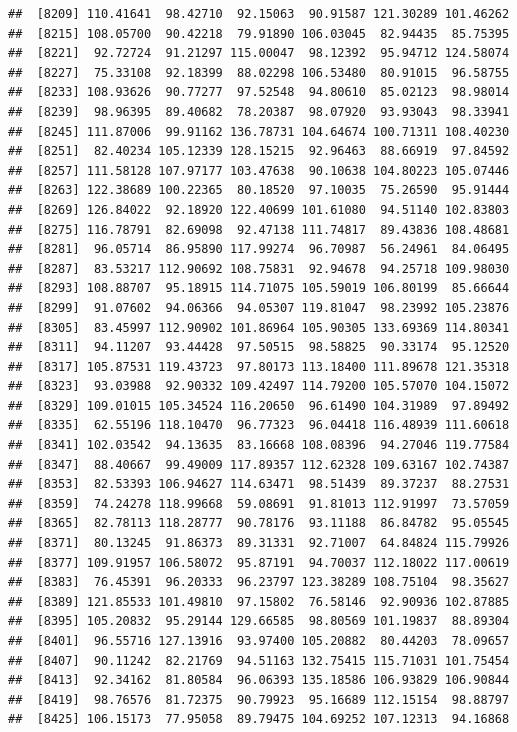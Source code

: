\documentclass[
]{article}
\begin{document}
\begin{verbatim}
##  [8209] 110.41641  98.42710  92.15063  90.91587 121.30289 101.46262
##  [8215] 108.05700  90.42218  79.91890 106.03045  82.94435  85.75395
##  [8221]  92.72724  91.21297 115.00047  98.12392  95.94712 124.58074
##  [8227]  75.33108  92.18399  88.02298 106.53480  80.91015  96.58755
##  [8233] 108.93626  90.77277  97.52548  94.80610  85.02123  98.98014
##  [8239]  98.96395  89.40682  78.20387  98.07920  93.93043  98.33941
##  [8245] 111.87006  99.91162 136.78731 104.64674 100.71311 108.40230
##  [8251]  82.40234 105.12339 128.15215  92.96463  88.66919  97.84592
##  [8257] 111.58128 107.97177 103.47638  90.10638 104.80223 105.07446
##  [8263] 122.38689 100.22365  80.18520  97.10035  75.26590  95.91444
##  [8269] 126.84022  92.18920 122.40699 101.61080  94.51140 102.83803
##  [8275] 116.78791  82.69098  92.47138 111.74817  89.43836 108.48681
##  [8281]  96.05714  86.95890 117.99274  96.70987  56.24961  84.06495
##  [8287]  83.53217 112.90692 108.75831  92.94678  94.25718 109.98030
##  [8293] 108.88707  95.18915 114.71075 105.59019 106.80199  85.66644
##  [8299]  91.07602  94.06366  94.05307 119.81047  98.23992 105.23876
##  [8305]  83.45997 112.90902 101.86964 105.90305 133.69369 114.80341
##  [8311]  94.11207  93.44428  97.50515  98.58825  90.33174  95.12520
##  [8317] 105.87531 119.43723  97.80173 113.18400 111.89678 121.35318
##  [8323]  93.03988  92.90332 109.42497 114.79200 105.57070 104.15072
##  [8329] 109.01015 105.34524 116.20650  96.61490 104.31989  97.89492
##  [8335]  62.55196 118.10470  96.77323  96.04418 116.48939 111.60618
##  [8341] 102.03542  94.13635  83.16668 108.08396  94.27046 119.77584
##  [8347]  88.40667  99.49009 117.89357 112.62328 109.63167 102.74387
##  [8353]  82.53393 106.94627 114.63471  98.51439  89.37237  88.27531
##  [8359]  74.24278 118.99668  59.08691  91.81013 112.91997  73.57059
##  [8365]  82.78113 118.28777  90.78176  93.11188  86.84782  95.05545
##  [8371]  80.13245  91.86373  89.31331  92.71007  64.84824 115.79926
##  [8377] 109.91957 106.58072  95.87191  94.70037 112.18022 117.00619
##  [8383]  76.45391  96.20333  96.23797 123.38289 108.75104  98.35627
##  [8389] 121.85533 101.49810  97.15802  76.58146  92.90936 102.87885
##  [8395] 105.20832  95.29144 129.66585  98.80569 101.19837  88.89304
##  [8401]  96.55716 127.13916  93.97400 105.20882  80.44203  78.09657
##  [8407]  90.11242  82.21769  94.51163 132.75415 115.71031 101.75454
##  [8413]  92.34162  81.80584  96.06393 135.18586 106.93829 106.90844
##  [8419]  98.76576  81.72375  90.79923  95.16689 112.15154  98.88797
##  [8425] 106.15173  77.95058  89.79475 104.69252 107.12313  94.16868

\end{verbatim}
\end{document}

